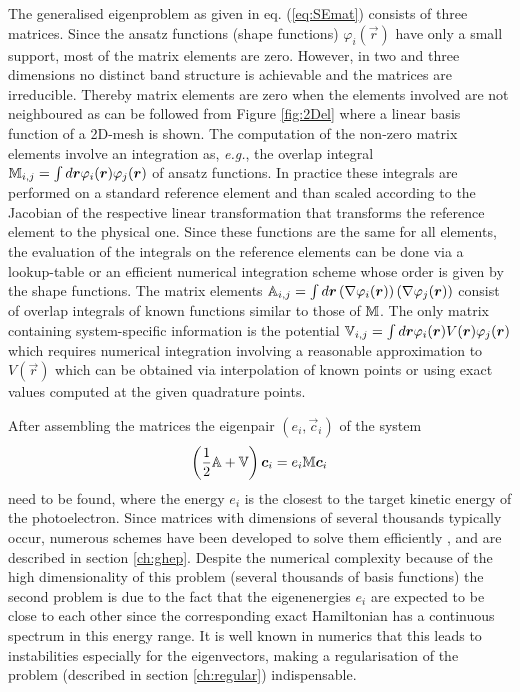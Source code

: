 The generalised eigenproblem as given in eq. (\ref{eq:SEmat}) consists of three matrices.
Since the ansatz functions (shape functions) $\varphi_i(\vec{r})$ have only a small support, most of the matrix elements are zero. 
However, in two and three dimensions no distinct band structure is achievable and the matrices are irreducible.
Thereby matrix elements are zero when the elements involved are not neighboured as can be followed from Figure \ref{fig:2Del} where a linear basis function of a 2D-mesh is shown.
The computation of the non-zero matrix elements involve an integration as, \textit{e.g.}, the overlap integral $\mathbb{M}_{i,j}=\int d \bm{r} \varphi_i(\bm{r}) \varphi_j(\bm{r})$ of ansatz functions.
In practice these integrals are performed on a standard reference element and than scaled according to the Jacobian of the respective linear transformation that transforms the reference element to the physical one.
Since these functions are the same for all elements, the evaluation of the integrals on the reference elements can be done via a lookup-table or an efficient numerical integration scheme whose order is given by the shape functions.
The matrix elements $\mathbb{A}_{i,j}=\int d \bm{r} \left(\nabla \varphi_i(\bm{r})\right)\left(\nabla \varphi_j(\bm{r})\right)$ consist of overlap integrals of known functions similar to those of $\mathbb{M}$.
The only matrix containing system-specific information is the potential $\mathbb{V}_{i,j}=\int d \bm{r} \varphi_i(\bm{r}) V(\bm{r}) \varphi_j(\bm{r})$ which requires numerical integration involving a reasonable approximation to $V(\vec{r})$ which can be obtained via interpolation of known points or using exact values computed at the given quadrature points.

After assembling the matrices the eigenpair $(e_i, \vec{c}_i)$ of the system
\begin{equation} \label{eq:SEmat2}
\left(\frac 12 \mathbb{A}+\mathbb{V}\right)\bm{c}_i = e_i \mathbb{M}\bm{c}_i
\end{equation}
need to be found, where the energy $e_i$ is the closest to the target kinetic energy of the photoelectron.
Since matrices with dimensions of several thousands typically occur, numerous schemes have been developed to solve them efficiently \cite{davidson,arnoldi, gpusolver,krylov}, and are described in section \ref{ch:ghep}.
Despite the numerical complexity because of the high dimensionality of this problem (several thousands of basis functions) the second problem is due to the fact that the eigenenergies $e_i$ are expected to be close to each other since the corresponding exact Hamiltonian has a continuous spectrum in this energy range.
It is well known in numerics that this leads to instabilities especially for the eigenvectors, making a regularisation of the problem (described in section \ref{ch:regular}) indispensable.

